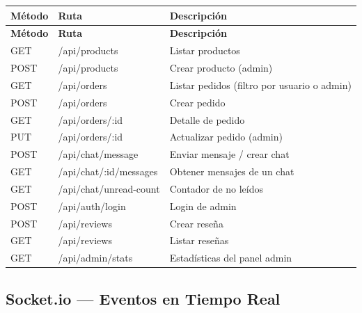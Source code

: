 \documentclass[12pt,a4paper]{article}
\begin{document}
\begin{longtable}{|l|l|l|}
\hline
\textbf{Método} & \textbf{Ruta} & \textbf{Descripción} \\ \hline
\endfirsthead
\hline
\textbf{Método} & \textbf{Ruta} & \textbf{Descripción} \\ \hline
\endhead
GET  & /api/products & Listar productos \\ \hline
POST & /api/products & Crear producto (admin) \\ \hline
GET  & /api/orders & Listar pedidos (filtro por usuario o admin) \\ \hline
POST & /api/orders & Crear pedido \\ \hline
GET  & /api/orders/:id & Detalle de pedido \\ \hline
PUT  & /api/orders/:id & Actualizar pedido (admin) \\ \hline
POST & /api/chat/message & Enviar mensaje / crear chat \\ \hline
GET  & /api/chat/:id/messages & Obtener mensajes de un chat \\ \hline
GET  & /api/chat/unread-count & Contador de no leídos \\ \hline
POST & /api/auth/login & Login de admin \\ \hline
POST & /api/reviews & Crear reseña \\ \hline
GET  & /api/reviews & Listar reseñas \\ \hline
GET  & /api/admin/stats & Estadísticas del panel admin \\ \hline
\end{longtable}

\subsection{Socket.io --- Eventos en Tiempo Real}
\end{document}
